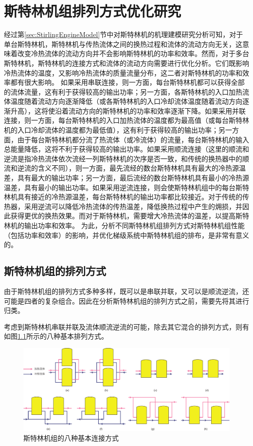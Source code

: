 \chapter{斯特林机组排列方式优化研究}
\label{cha:optSEA}

经过第\ref{sec:StirlingEngineModel}节中对斯特林机的机理建模研究分析可知，对于单台斯特林机，斯特林机与传热流体之间的换热过程和流体的流动方向无关，这意味着改变冷热流体的流动方向并不会影响斯特林机的功率和效率。然而，对于多台斯特林机，斯特林机的连接方式和流体的流动方向需要进行优化分析。它们既影响冷热流体的温度，又影响冷热流体的质量流量分布，这二者对斯特林机的功率和效率都有很大影响。
如果采用串联连接，则一方面，每台斯特林机都可以获得全部的流体流量，这有利于获得较高的输出功率；另一方面，各斯特林机的入口加热流体温度随着流动方向逐渐降低（或各斯特林机的入口冷却流体温度随着流动方向逐渐升高），这将使沿着流动方向的斯特林机的功率和效率逐渐下降。如果采用并联连接，则一方面，每台斯特林机的入口加热流体的温度都为最高值（或每台斯特林机的入口冷却流体的温度都为最低值），这有利于获得较高的输出功率；另一方面，由于每台斯特林机都分流了热流体（或冷流体）的流量，每台斯特林机的输入总能量降低，这将不利于获得较高的输出功率。如果采用顺流连接（这里的顺流和逆流是指冷热流体依次流经一列斯特林机的次序是否一致，和传统的换热器中的顺流和逆流的含义不同），则一方面，最先流经的数台斯特林机具有最大的冷热源温差，具有最大的输出功率；另一方面，最后流经的数台斯特林机具有最小的冷热源温差，具有最小的输出功率。如果采用逆流连接，则会使斯特林机组中的每台斯特林机具有接近的冷热源温差，每台斯特林机的输出功率都比较接近。对于传统的传热器，采用逆流可以降低冷热流体的传热温差，降低换热过程中产生的㶲损，并因此获得更优的换热效果。而对于斯特林机，需要增大冷热流体的温差，以提高斯特林机的输出功率和效率。
为此，分析不同斯特林机组排列方式对斯特林机组性能（包括功率和效率）的影响，并优化梯级系统中斯特林机组的排布，是非常有意义的。

\section{斯特林机组的排列方式}
\label{sec:connectionTypes}
由于斯特林机组的排列方式多种多样，既可以是串联并联，又可以是顺流逆流，还可能是四者的复杂组合。因此在分析斯特林机组的排列方式之前，需要先将其进行归类。

考虑到斯特林机串联并联及流体顺流逆流的可能，除去其它混合的排列方式，则有如图\ref{fig:EightBasicSEA}所示的八种基本排列方式。

\noindent \begin{figure}[htbp]
\begin{center}
	\includegraphics[width = 0.9\columnwidth]{fig/EightBasicSEA}
	\caption{斯特林机组的八种基本连接方式}
	\label{fig:EightBasicSEA}
\end{center}
\end{figure}

